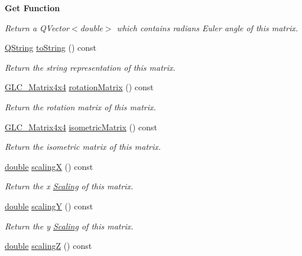 \begin{Indent}{\bf Get Function}
\begin{DoxyCompactItemize}
\begin{DoxyCompactList}\small\item\em Return a Q\-Vector$<$double$>$ which contains radians Euler angle of this matrix. \end{DoxyCompactList}\item 
\hyperlink{group___u_a_v_objects_plugin_gab9d252f49c333c94a72f97ce3105a32d}{Q\-String} \hyperlink{class_g_l_c___matrix4x4_abf893ee014b98fbedeea7d32c36b2e1f}{to\-String} () const 
\begin{DoxyCompactList}\small\item\em Return the string representation of this matrix. \end{DoxyCompactList}\item 
\hyperlink{class_g_l_c___matrix4x4}{G\-L\-C\-\_\-\-Matrix4x4} \hyperlink{class_g_l_c___matrix4x4_a7788c61d0148488215912fddb2e6c93d}{rotation\-Matrix} () const 
\begin{DoxyCompactList}\small\item\em Return the rotation matrix of this matrix. \end{DoxyCompactList}\item 
\hyperlink{class_g_l_c___matrix4x4}{G\-L\-C\-\_\-\-Matrix4x4} \hyperlink{class_g_l_c___matrix4x4_a6a43c6d7562905c6049e0b92d9ee5ac0}{isometric\-Matrix} () const 
\begin{DoxyCompactList}\small\item\em Return the isometric matrix of this matrix. \end{DoxyCompactList}\item 
\hyperlink{_super_l_u_support_8h_a8956b2b9f49bf918deed98379d159ca7}{double} \hyperlink{class_g_l_c___matrix4x4_aedebcb329959e59e9b55af7bcf6e7525}{scaling\-X} () const 
\begin{DoxyCompactList}\small\item\em Return the x \hyperlink{class_scaling}{Scaling} of this matrix. \end{DoxyCompactList}\item 
\hyperlink{_super_l_u_support_8h_a8956b2b9f49bf918deed98379d159ca7}{double} \hyperlink{class_g_l_c___matrix4x4_ae5bc2523270ee0adbbc46d746a3f9ee4}{scaling\-Y} () const 
\begin{DoxyCompactList}\small\item\em Return the y \hyperlink{class_scaling}{Scaling} of this matrix. \end{DoxyCompactList}\item 
\hyperlink{_super_l_u_support_8h_a8956b2b9f49bf918deed98379d159ca7}{double} \hyperlink{class_g_l_c___matrix4x4_ae015705c3f9f1c29fb4b6a4d91ba326c}{scaling\-Z} () const 

\end{DoxyCompactItemize}
\end{Indent}
